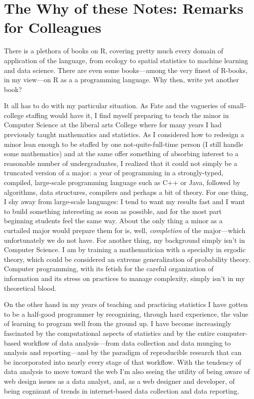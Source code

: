 \documentclass[]{book}
\theoremstyle{definition}
\theoremstyle{definition}
\theoremstyle{remark}
\begin{document}
\section{The Why of these Notes: Remarks for
Colleagues}\label{the-why-of-these-notes-remarks-for-colleagues}

There is a plethora of books on R, covering pretty much every domain of
application of the language, from ecology to spatial statistics to
machine learning and data science. There are even some books---among the
very finest of R-books, in my view---on R as a a programming language.
Why then, write yet another book?

It all has to do with my particular situation. As Fate and the vagueries
of small-college staffing would have it, I find myself preparing to
teach the minor in Computer Science at the liberal arts College where
for many years I had previously taught mathematics and statistics. As I
considered how to redesign a minor lean enough to be staffed by one
not-quite-full-time person (I still handle some mathematics) and at the
same offer something of absorbing interest to a reasonable number of
undergraduates, I realized that it could not simply be a truncated
version of a major: a year of programming in a strongly-typed, compiled,
large-scale programming language such as C++ or Java, followed by
algorithms, data structures, compilers and perhaps a bit of theory. For
one thing, I shy away from large-scale languages: I tend to want my
results fast and I want to build something interesting as soon as
possible, and for the most part beginning students feel the same way.
About the only thing a minor as a curtailed major would prepare them for
is, well, \emph{completion} of the major---which unfortunately we do not
have. For another thing, my background simply isn't in Computer Science.
I am by training a mathematician with a specialty in ergodic theory,
which could be considered an extreme generalization of probability
theory. Computer programming, with its fetish for the careful
organization of information and its stress on practices to manage
complexity, simply isn't in my theoretical blood.

On the other hand in my years of teaching and practicing statistics I
have gotten to be a half-good programmer by recognizing, through hard
experience, the value of learning to program well from the ground up. I
have become increasingly fascinated by the computational aspects of
statistics and by the entire computer-based workflow of data
analysis---from data collection and data munging to analysis and
reporting---and by the paradigm of reproducible research that can be
incorporated into nearly every stage of that workflow. With the tendency
of data analysis to move toward the web I'm also seeing the utility of
being aware of web design issues as a data analyst, and, as a web
designer and developer, of being cognizant of trends in internet-based
data collection and data reporting.
\end{document}
